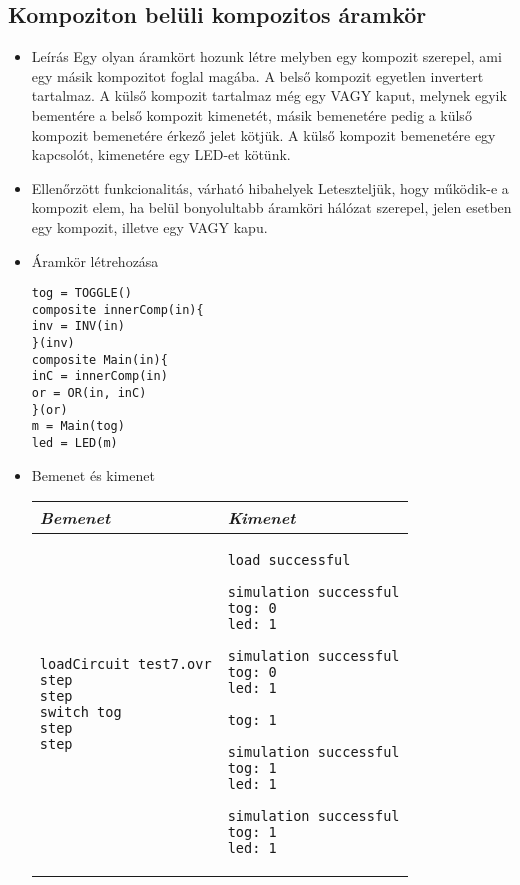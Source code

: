 \subsection{Kompoziton belüli kompozitos áramkör}
\begin{itemize}
\item Leírás\newline
Egy olyan áramkört hozunk létre melyben egy kompozit szerepel, ami egy másik kompozitot foglal magába. A belső kompozit egyetlen invertert tartalmaz. A külső kompozit tartalmaz még egy VAGY kaput, melynek egyik bementére a belső kompozit kimenetét, másik bemenetére pedig a külső kompozit bemenetére érkező jelet kötjük. A külső kompozit bemenetére egy kapcsolót, kimenetére egy LED-et kötünk.
\item Ellenőrzött funkcionalitás, várható hibahelyek\newline
Leteszteljük, hogy működik-e a kompozit elem, ha belül bonyolultabb áramköri hálózat szerepel, jelen esetben egy kompozit, illetve egy VAGY kapu.

\item Áramkör létrehozása

\begin{verbatim}
tog = TOGGLE()
composite innerComp(in){
inv = INV(in)
}(inv)
composite Main(in){
inC = innerComp(in)
or = OR(in, inC)
}(or)
m = Main(tog)
led = LED(m)
\end{verbatim}

\item Bemenet és kimenet\newline

\begin{tabular}{|p{7cm}|p{7cm}|} 
\hline 
\textit{Bemenet} & \textit{Kimenet} \\ \hline
\begin{verbatim}
loadCircuit test7.ovr
step
step
switch tog
step
step
\end{verbatim}
& 
\begin{verbatim}
load successful

simulation successful
tog: 0
led: 1

simulation successful
tog: 0
led: 1

tog: 1

simulation successful
tog: 1
led: 1

simulation successful
tog: 1
led: 1
\end{verbatim}
\\ \hline
\end{tabular}

\end{itemize}


